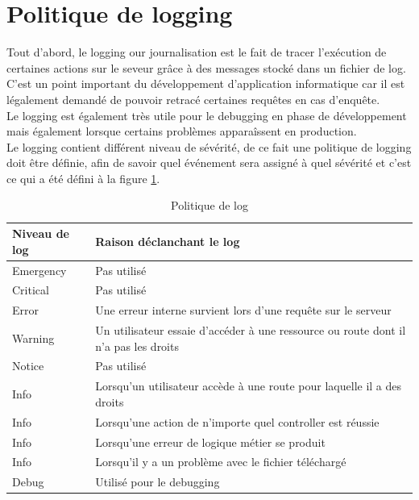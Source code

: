 \documentclass[
    iai, %
    il, %
]{heig-tb}
\begin{document}
\section{Politique de logging}
Tout d'abord, le logging our journalisation est le fait de tracer l'exécution de certaines actions sur le seveur grâce à des messages stocké dans un fichier de log. \\
C'est un point important du développement d'application informatique car il est légalement demandé de pouvoir retracé certaines requêtes en cas d'enquête. \\
Le logging est également très utile pour le debugging en phase de développement mais également lorsque certains problèmes apparaîssent en production. \\
Le logging contient différent niveau de sévérité, de ce fait une politique de logging doit être définie, afin de savoir quel événement sera assigné à quel sévérité et c'est ce qui a été défini à la figure \ref{politique-log}.

\begin{table}[h]
    \begin{center}
        \caption{Politique de log\label{politique-log}}
        \begin{tabularx}{1.0\textwidth} {X|X}
            Niveau de log & Raison déclanchant le log                                                           \\ \hline
            Emergency     & Pas utilisé                                                                         \\
            Critical      & Pas utilisé                                                                         \\
            Error         & Une erreur interne survient lors d'une requête sur le serveur                       \\
            Warning       & Un utilisateur essaie d'accéder à une ressource ou route dont il n'a pas les droits \\
            Notice        & Pas utilisé                                                                         \\
            Info          & Lorsqu'un utilisateur accède à une route pour laquelle il a des droits              \\
            Info          & Lorsqu'une action de n'importe quel controller est réussie                          \\
            Info          & Lorsqu'une erreur de logique métier se produit                                      \\
            Info          & Lorsqu'il y a un problème avec le fichier téléchargé                                \\
            Debug         & Utilisé pour le debugging                                                           \\
        \end{tabularx}
    \end{center}
\end{table}
\end{document}
